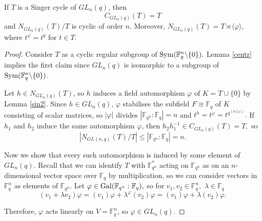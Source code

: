 \begin{Th}\label{sin1} 
If $T$ is a Singer cycle of $GL_n(q)$, then $$C_{GL_n(q)}(T) = T$$
and $N_{GL_n(q)} (T) /T$ is cyclic of order $n$. Moreover, $N_{GL_n(q)} (T)=T \rtimes \langle \varphi \rangle$, where $t^{\varphi}=t^q$ for $t \in T.$ 
\end{Th}
\begin{proof}
Consider $T$ as a cyclic regular subgroup of $\mathrm{Sym}(\mathbb{F}_q^n \backslash \{0\}).$  Lemma \ref{centr} implies the first claim  since $GL_n(q)$ is isomorphic to a subgroup of  $\mathrm{Sym}(\mathbb{F}_q^n \backslash \{0\})$.

Let $h \in N_{GL_n(q)} (T)$, so $h$ induces a field automorphism $\varphi$ of $K=T \cup \{0\}$ by Lemma \ref{sin2}. Since $h \in GL_n(q)$, $\varphi$ stabilises the subfield $F \cong \mathbb{F}_q$ of $K$ consisting of scalar matrices, so $|\varphi|$ divides $|\mathbb{F}_{q^n}:\mathbb{F}_q|=n$ and $t^h=t^{\varphi}=t^{q^{(n/|\varphi|)}}.$ If $h_1$ and $h_2$ induce the same automorphism $\varphi$, then $h_2h_1^{-1} \in C_{GL_n(q)}(T)=T,$ so 
$$|N_{GL(n,q)} (T) /T|\le |\mathbb{F}_{q^n}:\mathbb{F}_q|=n.$$

Now we show that every such automorphism is induced by some element of $GL_n(q).$ Recall that we can identify $T$ with $\mathbb{F}_{q^n}^*$ acting on $\mathbb{F}_{q^n}$ as on an $n$-dimensional vector space over $\mathbb{F}_q$ by multiplication, so we can consider vectors in $\mathbb{F}_q^n$ as elements of $\mathbb{F}_{q^n}.$   %
Let $\varphi \in \mathrm{Gal}(\mathbb{F}_{q^n}:\mathbb{F}_q),$ so for $v_1, v_2 \in \mathbb{F}_q^n,$ $\lambda \in \mathbb{F}_q$ 
$$(v_1+ \lambda v_2) \varphi = (v_1) \varphi+ \lambda^{\varphi} (v_2)\varphi=(v_1) \varphi+ \lambda (v_2)\varphi.$$

Therefore, $\varphi$ acts linearly on $V=\mathbb{F}_q^n$, so $\varphi \in GL_n(q).$  
\end{proof}







